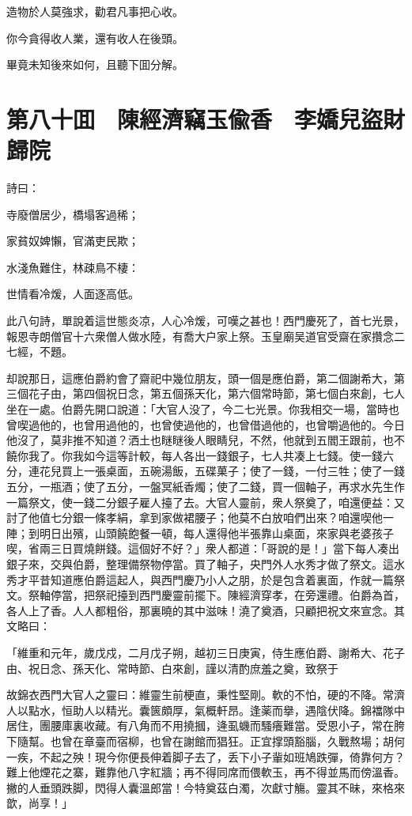 造物於人莫強求，勸君凡事把心收。

你今貪得收人業，還有收人在後頭。

畢竟未知後來如何，且聽下囬分解。

\chapter*{第八十囬　陳經濟竊玉偸香　李嬌兒盜財歸院}

詩曰：

寺廢僧居少，橋塌客過稀；

家貧奴婢懶，官滿吏民欺；

水淺魚難住，林疎鳥不棲：

世情看冷煖，人面逐高低。

此八句詩，單說着這世態炎凉，人心冷煖，可嘆之甚也！西門慶死了，首七光景，報恩寺朗僧官十六衆僧人做水陸，有喬大户家上祭。玉皇廟吴道官受齋在家攢念二七經，不題。

却說那日，這應伯爵約會了齋祀中幾位朋友，頭一個是應伯爵，第二個謝希大，第三個花子由，第四個祝日念，第五個孫天化，第六個常時節，第七個白來創，七人坐在一處。伯爵先開口說道：「大官人没了，今二七光景。你我相交一場，當時也曾喫過他的，也曾用過他的，也曾使過他的，也曾借過他的，也曾嚼過他的。今日他沒了，莫非推不知道？洒土也瞇瞇後人眼睛兒，不然，他就到五閻王跟前，也不饒你我了。你我如今這等計較，每人各出一錢銀子，七人共凑上七錢。使一錢六分，連花兒買上一張桌面，五碗湯飯，五碟菓子；使了一錢，一付三牲；使了一錢五分，一瓶酒；使了五分，一盤冥紙香燭；使了二錢，買一個軸子，再求水先生作一篇祭文，使一錢二分銀子雇人擡了去。大官人靈前，衆人祭奠了，咱還便益：又討了他值七分銀一條孝絹，拿到家做裙腰子；他莫不白放咱們出來？咱還喫他一陣；到明日出殯，山頭饒飽餐一頓，每人還得他半張靠山桌面，來家與老婆孩子喫，省兩三日買燒餅錢。這個好不好？」衆人都道：「哥說的是！」當下每人凑出銀子來，交與伯爵，整理備祭物停當。買了軸子，央門外人水秀才做了祭文。這水秀才平昔知道應伯爵這起人，與西門慶乃小人之朋，於是包含着裏面，作就一篇祭文。祭軸停當，把祭祀擡到西門慶靈前擺下。陳經濟穿孝，在旁還禮。伯爵為首，各人上了香。人人都粗俗，那裏曉的其中滋味！澆了奠酒，只顧把祝文來宣念。其文略曰：

「維重和元年，歲戊戍，二月戊子朔，越初三日庚寅，侍生應伯爵、謝希大、花子由、祝日念、孫天化、常時節、白來創，謹以清酌庶羞之奠，致祭于

故錦衣西門大官人之靈曰：維靈生前梗直，秉性堅剛。軟的不怕，硬的不降。常濟人以點水，恒助人以精光。囊篋頗厚，氣概軒昂。逢薬而擧，遇陰伏降。錦襠隊中居住，團腰庫裏收藏。有八角而不用撓摑，逄虱蟣而騷癢難當。受恩小子，常在胯下隨幫。也曾在章臺而宿柳，也曾在謝館而猖狂。正宜撑頭豁腦，久戰熬場；胡何一疾，不起之殃！現今你便長伸着脚子去了，丢下小子軰如班鳩跌彈，倚靠何方？難上他煙花之寨，難靠他八字紅牆；再不得同席而偎軟玉，再不得並馬而傍溫香。撇的人垂頭跌脚，閃得人囊溫郎當！今特奠茲白濁，次獻寸觴。靈其不昧，來格來歆，尚享！」

